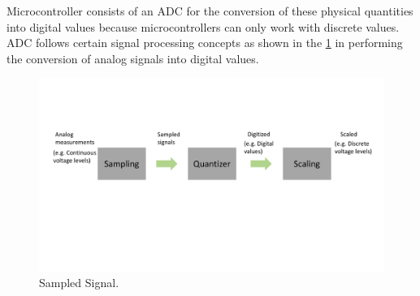 Microcontroller consists of an ADC for the conversion of these physical quantities into digital values because microcontrollers can only work with discrete values. ADC follows certain signal processing concepts as shown in the \cref{fig:ADC} in performing the conversion of analog signals into digital values.

\begin{figure}[hbt]
\centering
\includegraphics[trim=0 250 25 138, clip, width=150mm]{images/ADC.pdf}
\caption{Sampled Signal.}
\label{fig:ADC}
\end{figure}

